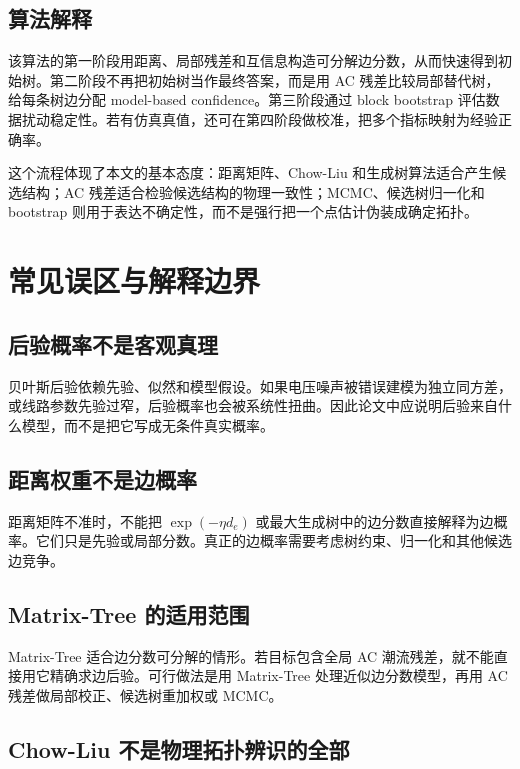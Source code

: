\documentclass[UTF8,12pt,openany]{ctexrep}
\numberwithin{equation}{chapter}
\theoremstyle{definition}
\theoremstyle{plain}
\begin{document}
\section{算法解释}

该算法的第一阶段用距离、局部残差和互信息构造可分解边分数，从而快速得到初始树。第二阶段不再把初始树当作最终答案，而是用 AC 残差比较局部替代树，给每条树边分配 model-based confidence。第三阶段通过 block bootstrap 评估数据扰动稳定性。若有仿真真值，还可在第四阶段做校准，把多个指标映射为经验正确率。

这个流程体现了本文的基本态度：距离矩阵、Chow-Liu 和生成树算法适合产生候选结构；AC 残差适合检验候选结构的物理一致性；MCMC、候选树归一化和 bootstrap 则用于表达不确定性，而不是强行把一个点估计伪装成确定拓扑。

\chapter{常见误区与解释边界}

\section{后验概率不是客观真理}

贝叶斯后验依赖先验、似然和模型假设。如果电压噪声被错误建模为独立同方差，或线路参数先验过窄，后验概率也会被系统性扭曲。因此论文中应说明后验来自什么模型，而不是把它写成无条件真实概率。

\section{距离权重不是边概率}

距离矩阵不准时，不能把 $\exp(-\eta d_e)$ 或最大生成树中的边分数直接解释为边概率。它们只是先验或局部分数。真正的边概率需要考虑树约束、归一化和其他候选边竞争。

\section{Matrix-Tree 的适用范围}

Matrix-Tree 适合边分数可分解的情形。若目标包含全局 AC 潮流残差，就不能直接用它精确求边后验。可行做法是用 Matrix-Tree 处理近似边分数模型，再用 AC 残差做局部校正、候选树重加权或 MCMC。

\section{Chow-Liu 不是物理拓扑辨识的全部}
\end{document}
